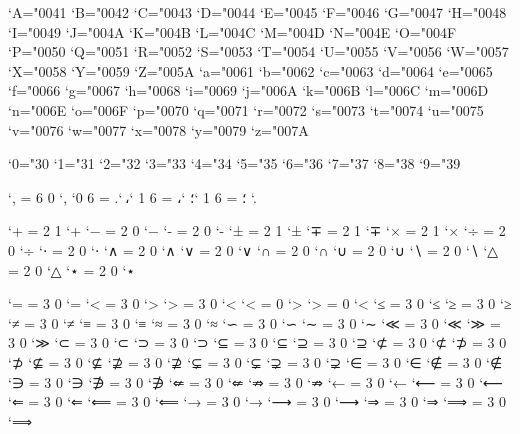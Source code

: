 \Umathcodenum`A="0041 \Umathcodenum`B="0042 \Umathcodenum`C="0043
\Umathcodenum`D="0044 \Umathcodenum`E="0045 \Umathcodenum`F="0046
\Umathcodenum`G="0047 \Umathcodenum`H="0048 \Umathcodenum`I="0049
\Umathcodenum`J="004A \Umathcodenum`K="004B \Umathcodenum`L="004C
\Umathcodenum`M="004D \Umathcodenum`N="004E \Umathcodenum`O="004F
\Umathcodenum`P="0050 \Umathcodenum`Q="0051 \Umathcodenum`R="0052
\Umathcodenum`S="0053 \Umathcodenum`T="0054 \Umathcodenum`U="0055
\Umathcodenum`V="0056 \Umathcodenum`W="0057 \Umathcodenum`X="0058
\Umathcodenum`Y="0059 \Umathcodenum`Z="005A \Umathcodenum`a="0061
\Umathcodenum`b="0062 \Umathcodenum`c="0063 \Umathcodenum`d="0064
\Umathcodenum`e="0065 \Umathcodenum`f="0066 \Umathcodenum`g="0067
\Umathcodenum`h="0068 \Umathcodenum`i="0069 \Umathcodenum`j="006A
\Umathcodenum`k="006B \Umathcodenum`l="006C \Umathcodenum`m="006D
\Umathcodenum`n="006E \Umathcodenum`o="006F \Umathcodenum`p="0070
\Umathcodenum`q="0071 \Umathcodenum`r="0072 \Umathcodenum`s="0073
\Umathcodenum`t="0074 \Umathcodenum`u="0075 \Umathcodenum`v="0076
\Umathcodenum`w="0077 \Umathcodenum`x="0078 \Umathcodenum`y="0079
\Umathcodenum`z="007A

\Umathcodenum`0="30 \Umathcodenum`1="31 \Umathcodenum`2="32
\Umathcodenum`3="33 \Umathcodenum`4="34 \Umathcodenum`5="35
\Umathcodenum`6="36 \Umathcodenum`7="37 \Umathcodenum`8="38
\Umathcodenum`9="39

\Umathcode`, = 6 0 `,    %
\Umathcode`؛ = 6 1 `؛    %
\Umathcode`، = 6 1 `،    %
\Umathcode`. = 6 0 `.    %

\Umathcode`+ = 2 1 `+
\Umathcode`− = 2 0 `−    %
\Umathcode`- = 2 0 `-  
\Umathcode`± = 2 1 `±
\Umathcode`∓ = 2 1 `∓
\Umathcode`× = 2 1 `×
\Umathcode`÷ = 2 0 `÷
\Umathcode`⋅ = 2 0 `⋅
\Umathcode`∧ = 2 0 `∧
\Umathcode`∨ = 2 0 `∨
\Umathcode`∩ = 2 0 `∩
\Umathcode`∪ = 2 0 `∪
\Umathcode`∖ = 2 0 `∖
\Umathcode`△ = 2 0 `△
\Umathcode`⋆ = 2 0 `⋆

\Umathcode`= = 3 0 `=
\Umathcode`< = 3 0 `>
\Umathcode`> = 3 0 `<
\Udelcode`< = 0 `>       %
\Udelcode`> = 0 `<       %
\Umathcode`≤ = 3 0 `≤
\Umathcode`≥ = 3 0 `≥
\Umathcode`≠ = 3 0 `≠
\Umathcode`≡ = 3 0 `≡
\Umathcode`≈ = 3 0 `≈
\Umathcode`∽ = 3 0 `∽
\Umathcode`∼ = 3 0 `∼
\Umathcode`≪ = 3 0 `≪
\Umathcode`≫ = 3 0 `≫
\Umathcode`⊂ = 3 0 `⊂
\Umathcode`⊃ = 3 0 `⊃
\Umathcode`⊆ = 3 0 `⊆
\Umathcode`⊇ = 3 0 `⊇
\Umathcode`⊄ = 3 0 `⊄
\Umathcode`⊅ = 3 0 `⊅
\Umathcode`⊈ = 3 0 `⊈
\Umathcode`⊉ = 3 0 `⊉
\Umathcode`⊊ = 3 0 `⊊
\Umathcode`⊋ = 3 0 `⊋
\Umathcode`∈ = 3 0 `∈
\Umathcode`∉ = 3 0 `∉
\Umathcode`∋ = 3 0 `∋
\Umathcode`∌ = 3 0 `∌
\Umathcode`⇍ = 3 0 `⇍
\Umathcode`⇏ = 3 0 `⇏
\Umathcode`← = 3 0 `←
\Umathcode`⟵ = 3 0 `⟵
\Umathcode`⇐ = 3 0 `⇐
\Umathcode`⟸ = 3 0 `⟸
\Umathcode`→ = 3 0 `→
\Umathcode`⟶ = 3 0 `⟶
\Umathcode`⇒ = 3 0 `⇒
\Umathcode`⟹ = 3 0 `⟹




